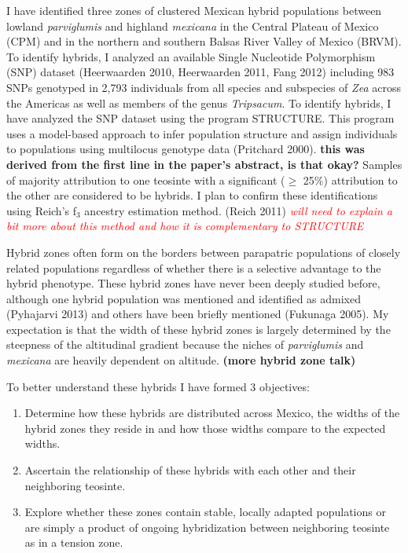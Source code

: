 \documentclass[12pt]{amsart}
\newcommand{\mbh}[1]{\textcolor{red}{ \emph{\scriptsize  #1}} }
\begin{document}
I have identified three zones of clustered Mexican hybrid populations between lowland \textit{parviglumis} and highland \textit{mexicana} in the Central Plateau of Mexico (CPM) and in the northern and southern Balsas River Valley of Mexico (BRVM). 
To identify hybrids, I analyzed an available Single Nucleotide Polymorphism (SNP) dataset  (Heerwaarden 2010, Heerwaarden 2011, Fang 2012) including 983 SNPs genotyped in 2,793 individuals from all species and subspecies of \textit{Zea} across the Americas as well as members of the genus \textit{Tripsacum}.  
To identify hybrids, I have analyzed the SNP dataset using the program STRUCTURE.
This program uses a model-based approach to infer population structure and assign individuals to populations using multilocus genotype data (Pritchard 2000). \textbf{this was derived from the first line in the paper's abstract, is that okay?}
Samples of majority attribution to one teosinte with a significant ($\geq$ 25\%) attribution to the other are considered to be hybrids.
I plan to confirm these identifications using Reich's f$_{\text{3}}$ ancestry estimation method. (Reich  2011)\mbh{will need to explain a bit more about this method and how it is complementary to STRUCTURE}


Hybrid zones often form on the borders between parapatric populations of closely related populations regardless of whether there is a selective advantage to the hybrid phenotype.
These hybrid zones have never been deeply studied before, although one hybrid population was mentioned and identified as admixed (Pyhajarvi 2013)  and others have been briefly mentioned (Fukunaga 2005).
My expectation is that the width of these hybrid zones is largely determined by the steepness of the altitudinal gradient because the niches of \textit{parviglumis} and \textit{mexicana} are heavily dependent on altitude.
 \textbf{(more hybrid zone talk)} 


To better understand these hybrids I have formed 3 objectives: 
\begin{enumerate} 
	\item Determine how these hybrids are distributed across Mexico, the widths of the hybrid zones they reside in and how those widths compare to the expected widths.
	\item Ascertain the relationship of these hybrids with each other and their neighboring teosinte.
	\item Explore whether these zones contain stable, locally adapted populations or are simply a product of ongoing hybridization between neighboring teosinte as in a tension zone.
\end{enumerate} 
\end{document}
